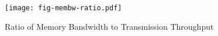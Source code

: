 \begin{figure}[t]
\texttt{[image: fig-membw-ratio.pdf]}
\caption{Ratio of Memory Bandwidth to Transmission Throughput}
\label{fig:membw-ratio}
\end{figure}
